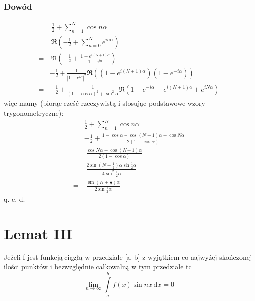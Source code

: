 \documentclass{article}
\begin{document}
\subsubsection*{Dowód}
\begin{displaymath}
{\begin{aligned}&\;{\frac {1}{2}}+\sum _{n=1}^{N}\cos n\alpha \\=&\ \Re \left(-{\frac {1}{2}}+\sum _{n=0}^{N}e^{in\alpha }\right)\\=&\ \Re \left(-{\frac {1}{2}}+{\frac {1-e^{i(N+1)\alpha }}{1-e^{i\alpha }}}\right)\\=&-{\frac {1}{2}}+{\frac {1}{|1-e^{i\alpha }|^{2}}}\Re ((1-e^{i(N+1)\alpha })(1-e^{-i\alpha }))\\=&-{\frac {1}{2}}+{\frac {1}{(1-\cos \alpha )^{2}+\sin ^{2}\alpha }}\Re (1-e^{-i\alpha }-e^{i(N+1)\alpha }+e^{iN\alpha })\end{aligned}}
\end{displaymath}
więc mamy (biorąc cześć rzeczywistą i stosując podstawowe wzory trygonometryczne): 
\begin{displaymath}
{\begin{aligned}&{\frac {1}{2}}+\sum _{n=1}^{N}\cos n\alpha \\=&-{\frac {1}{2}}+{\frac {1-\cos \alpha -\cos(N+1)\alpha +\cos N\alpha }{2(1-\cos \alpha )}}\\=&\;{\frac {\cos N\alpha -\cos(N+1)\alpha }{2(1-\cos \alpha )}}\\=&\;{\frac {2\sin \left(N+{\frac {1}{2}}\right)\alpha \sin {\frac {1}{2}}\alpha }{4\sin ^{2}{\frac {1}{2}}\alpha }}\\=&\;{\frac {\sin \left(N+{\frac {1}{2}}\right)\alpha }{2\sin {\frac {1}{2}}\alpha }}\end{aligned}}
\end{displaymath}
q. e. d.

\section*{Lemat III}
Jeżeli f jest funkcją ciągłą w przedziale [a, b] z wyjątkiem co najwyżej skończonej ilości punktów i bezwzględnie całkowalną w tym przedziale to 
\begin{equation*}
\lim _{n\to \infty }\int \limits _{a}^{b}f(x)\sin nx\,{\text{d}}x=0
\end{equation*}
\end{document}
